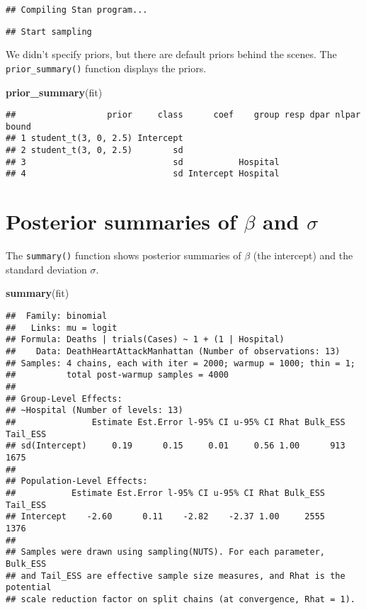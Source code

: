 \documentclass[
]{book}
\newenvironment{Shaded}{\begin{snugshade}}{\end{snugshade}}
\newcommand{\KeywordTok}[1]{\textcolor[rgb]{0.13,0.29,0.53}{\textbf{#1}}}
\newcommand{\NormalTok}[1]{#1}
\begin{document}
\begin{verbatim}
## Compiling Stan program...
\end{verbatim}

\begin{verbatim}
## Start sampling
\end{verbatim}

We didn't specify priors, but there are default priors behind the scenes. The \texttt{prior\_summary()} function displays the priors.

\begin{Shaded}
\begin{Highlighting}[]
\KeywordTok{prior_summary}\NormalTok{(fit)}
\end{Highlighting}
\end{Shaded}

\begin{verbatim}
##                  prior     class      coef    group resp dpar nlpar bound
## 1 student_t(3, 0, 2.5) Intercept                                         
## 2 student_t(3, 0, 2.5)        sd                                         
## 3                             sd           Hospital                      
## 4                             sd Intercept Hospital
\end{verbatim}

\hypertarget{posterior-summaries-of-beta-and-sigma}{%
\section{\texorpdfstring{Posterior summaries of \(\beta\) and \(\sigma\)}{Posterior summaries of \textbackslash beta and \textbackslash sigma}}\label{posterior-summaries-of-beta-and-sigma}}

The \texttt{summary()} function shows posterior summaries of \(\beta\) (the intercept) and the standard deviation \(\sigma\).

\begin{Shaded}
\begin{Highlighting}[]
\KeywordTok{summary}\NormalTok{(fit)}
\end{Highlighting}
\end{Shaded}

\begin{verbatim}
##  Family: binomial 
##   Links: mu = logit 
## Formula: Deaths | trials(Cases) ~ 1 + (1 | Hospital) 
##    Data: DeathHeartAttackManhattan (Number of observations: 13) 
## Samples: 4 chains, each with iter = 2000; warmup = 1000; thin = 1;
##          total post-warmup samples = 4000
## 
## Group-Level Effects: 
## ~Hospital (Number of levels: 13) 
##               Estimate Est.Error l-95% CI u-95% CI Rhat Bulk_ESS Tail_ESS
## sd(Intercept)     0.19      0.15     0.01     0.56 1.00      913     1675
## 
## Population-Level Effects: 
##           Estimate Est.Error l-95% CI u-95% CI Rhat Bulk_ESS Tail_ESS
## Intercept    -2.60      0.11    -2.82    -2.37 1.00     2555     1376
## 
## Samples were drawn using sampling(NUTS). For each parameter, Bulk_ESS
## and Tail_ESS are effective sample size measures, and Rhat is the potential
## scale reduction factor on split chains (at convergence, Rhat = 1).
\end{verbatim}
\end{document}
